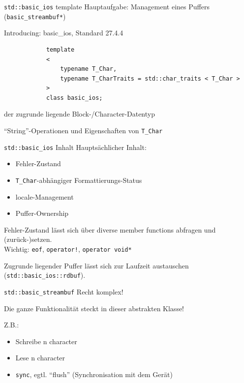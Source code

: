 \begin{frame}[fragile]{\texttt{std::basic\_ios} template}
	Hauptaufgabe: Management eines Puffers (\texttt{basic\_streambuf*})
	
	\vspace{2em}
	
	\begin{block}{Introducing: basic\_ios, Standard 27.4.4}
		\begin{lstlisting}
			template
			<
			    typename T_Char,
			    typename T_CharTraits = std::char_traits < T_Char >
			>
			class basic_ios;
		\end{lstlisting}
		
		\vspace{1em}
		
		\begin{description}[leftmargin=5em]
			\item[\texttt{T\_Char}] der zugrunde liegende Block-/Character-Datentyp
			\item[\texttt{T\_CharTraits}] \enquote{String}-Operationen und Eigenschaften von \texttt{T\_Char}
		\end{description}
	\end{block}
\end{frame}

\begin{frame}{\texttt{std::basic\_ios} Inhalt}
	Hauptsächlicher Inhalt:
	\begin{itemize}
		\item Fehler-Zustand
		\item \texttt{T\_Char}-abhängiger Formattierungs-Status
		\item locale-Management
		\item Puffer-Ownership
	\end{itemize}
	
	\pause
	\vspace{2em}
	
	Fehler-Zustand lässt sich über diverse member functions abfragen und (zurück-)setzen.\\
	Wichtig: \texttt{eof}, \texttt{operator!}, \texttt{operator void*}
	
	\pause
	\vspace{2em}
	
	Zugrunde liegender Puffer lässt sich zur Laufzeit austauschen (\texttt{std::basic\_ios::rdbuf}).
\end{frame}

\begin{frame}{\texttt{std::basic\_streambuf}}
	Recht komplex!
	
	\pause
	\vspace{2em}
	
	Die ganze Funktionalität steckt in dieser abstrakten Klasse!
	
	Z.B.:
	\begin{itemize}
		\item Schreibe n character
		\item Lese n character
		\item \texttt{sync}, egtl. \enquote{flush} (Synchronisation mit dem Gerät)
	\end{itemize}
\end{frame}


